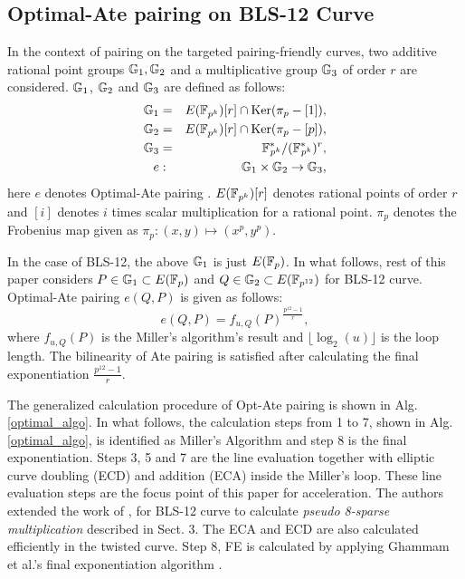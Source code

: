 \subsection{Optimal-Ate pairing on BLS-12 Curve}
In the context of pairing on the targeted pairing-friendly curves, two additive rational point groups ${\mathbb{G}}_{1}, {\mathbb{G}}_{2}$ and a multiplicative group ${\mathbb{G}}_{3}$ of order $r$ are considered. 
${\mathbb{G}}_{1}$, ${\mathbb{G}}_{2}$ and ${\mathbb{G}}_{3}$ are defined as follows:
\begin{eqnarray}\label{eq:g1}
{\mathbb{G}}_{1} & = &  E({\mathbb{F}}_{p^{k}}) [r] \cap \text{Ker}(\pi_p - [1]), \nonumber \\
{\mathbb{G}}_{2} & = &  E({\mathbb{F}}_{p^{k}}) [r] \cap \text{Ker}(\pi_p - [p]), \nonumber \\
{\mathbb{G}}_{3} & = & {{\mathbb{F}}^{\ast}}_{\!\!\!p^{k}}/({{\mathbb{F}}^{\ast}}_{\!\!\!p^{k}})^r, \nonumber \\
 e & : &{\mathbb{G}}_{1} \times {\mathbb{G}}_{2} \rightarrow {\mathbb{G}}_{3},
\end{eqnarray}
here $e$ denotes Optimal-Ate pairing \cite{DBLP:journals/tit/Vercauteren10}. $E({\mathbb{F}}_{p^{k}})[r]$ denotes rational points of order $r$ and $[i]$ denotes $i$ times scalar multiplication for a rational point. 
$\pi_p$ denotes the Frobenius map given as $\pi_p: (x,y) \mapsto (x^p,y^p)$.

In the case of BLS-12, the above ${\mathbb{G}}_{1}$ is just $E(\mathbb{F}_p)$. 
In what follows, rest of this paper considers $P \in {\mathbb{G}}_{1} \subset E(\mathbb{F}_p)$ and  $Q \in {\mathbb{G}}_{2} \subset  E(\mathbb{F}_{p^{12}})$ for BLS-12 curve.
Optimal-Ate pairing $e(Q,P)$ is given as follows:
\begin{equation}
	e(Q,P)=f_{u,Q}(P)^{\frac{p^{12}-1}{r}},
\end{equation}
where $f_{u,Q}(P)$ is the Miller's algorithm's result and $\lfloor \log_2 (u) \rfloor$ is the loop length. The bilinearity of Ate pairing is satisfied after calculating the final exponentiation $\frac{p^{12}-1}{r}$.


The generalized calculation procedure of Opt-Ate pairing is shown in Alg. \ref{optimal_algo}. 
In what follows, the calculation steps from 1 to 7, shown in Alg. \ref{optimal_algo}, is identified as Miller's Algorithm and step 8 is the final exponentiation. Steps 3, 5 and 7 are the line evaluation together with elliptic curve doubling (ECD) and addition (ECA) inside the Miller's loop. These line evaluation steps are the focus point of this paper for acceleration. 
The authors extended the work of \cite{PAIRING:MANS13},\cite{ICISC:KONSD16} for BLS-12 curve to calculate \textit{pseudo 8-sparse multiplication} described in Sect. 3.
The ECA and ECD are also calculated efficiently in the twisted curve. 
Step 8, FE is calculated by applying Ghammam et al.'s final exponentiation algorithm \cite{EPRINT:GhaFou16a}.

